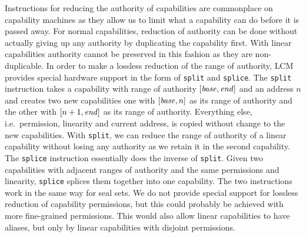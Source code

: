 \documentclass[acmsmall,review,anonymous]{acmart}\settopmatter{printfolios=true,printccs=false,printacmref=false}
\newcommand{\trgcm}{\textsc{LCM}}
\begin{document}
Instructions for reducing the authority of capabilities are commonplace on capability machines as they allow us to limit what a capability can do before it is passed away.
For normal capabilities, reduction of authority can be done without actually giving up any authority by duplicating the capability first.
With linear capabilities authority cannot be preserved in this fashion as they are non-duplicable.
In order to make a lossless reduction of the range of authority, \trgcm{} provides special hardware support in the form of \texttt{split} and \texttt{splice}.
The \texttt{split} instruction takes a capability with range of authority $[\mathit{base},\mathit{end}]$ and an address $n$ and creates two new capabilities one with $[\mathit{base},n]$ as its range of authority and the other with $[n+1,\mathit{end}]$ as its range of authority.
Everything else, i.e.\ permission, linearity and current address, is copied without change to the new capabilities.
With \texttt{split}, we can reduce the range of authority of a linear capability without losing any authority as we retain it in the second capability.
The \texttt{splice} instruction essentially does the inverse of \texttt{split}.
Given two capabilities with adjacent ranges of authority and the same permissions and linearity, \texttt{splice} splices them together into one capability.
The two instructions work in the same way for seal sets.
We do not provide special support for lossless reduction of capability permissions, but this could probably be achieved with more fine-grained permissions.
This would also allow linear capabilities to have aliases, but only by linear capabilities with disjoint permissions.
\end{document}
